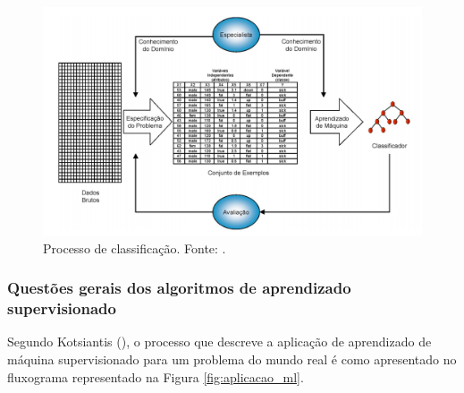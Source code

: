 \begin{figure}[H]
    \centering
    \includegraphics[scale=0.3]{figuras/referencial_teorico/processo_classificacao.png}
    \caption[Processo de classificação]{Processo de classificação. Fonte: \cite{Monard:2003}.}
    \label{fig:processo_classificacao}
\end{figure}

\subsubsection{Questões gerais dos algoritmos de aprendizado supervisionado}
	
Segundo Kotsiantis (\citeyear{Kotsiantis}), o processo que descreve a aplicação de aprendizado de máquina supervisionado para um problema do mundo real é como apresentado no fluxograma representado na Figura \ref{fig:aplicacao_ml}.

